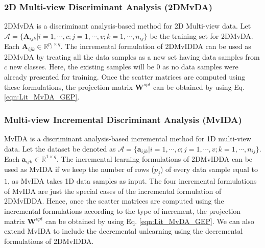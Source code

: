 \subsubsection{2D Multi-view Discriminant Analysis (2DMvDA)}
\label{ssubs:2DMvIDDA_2DMvDA}
2DMvDA is a discriminant analysis-based method for 2D Multi-view data. Let $\mathcal{A} = \{ \textbf{A}_{ijk} | i=1,\cdots,c; j=1,\cdots,v; k=1,\cdots,n_{ij} \}$ be the training set for 2DMvDA. Each $\textbf{A}_{ijk} \in \mathbb{R}^{p_j \times q}$. The incremental formulation of 2DMvIDDA can be used as 2DMvDA by treating all the data samples as a new set having data samples from $c$ new classes. Here, the existing samples will be $0$ as no data samples were already presented for training. Once the scatter matrices are computed using these formulations, the projection matrix $\textbf{W}^{opt}$ can be obtained by using Eq. \ref{eqn:Lit_MvDA_GEP}.




\subsubsection{Multi-view Incremental Discriminant Analysis (MvIDA)}
\label{ssubs:2DMvIDDA_MvIDA}
MvIDA is a discriminant analysis-based incremental method for 1D multi-view data. Let the dataset be denoted as $\mathcal{A} = \{ \textbf{a}_{ijk} | i=1,\cdots,c; j=1,\cdots,v; k=1,\cdots,n_{ij} \}$. Each $\textbf{a}_{ijk} \in \mathbb{R}^{1 \times q}$. The incremental learning formulations of 2DMvIDDA can be used as MvIDA if we keep the number of rows ($p_j$) of every data sample equal to $1$, as MvIDA takes 1D data samples as input. The four incremental formulations of MvIDA are just the special cases of the incremental formulation of 2DMvIDDA. Hence, once the scatter matrices are computed using the incremental formulations according to the type of increment, the projection matrix $\textbf{W}^{opt}$ can be obtained by using Eq. \ref{eqn:Lit_MvDA_GEP}. We can also extend MvIDA to include the decremental unlearning using the decremental formulations of 2DMvIDDA.




